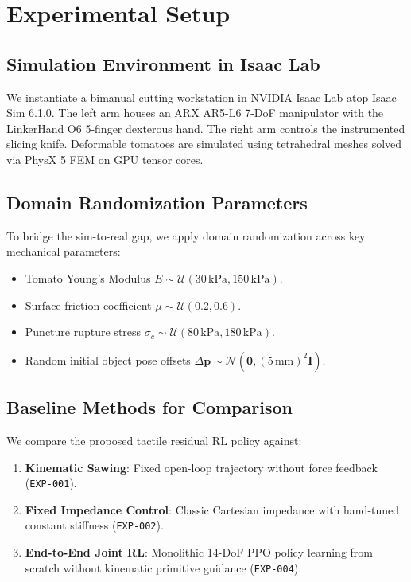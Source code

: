 \section{Experimental Setup}
\label{sec:experiments}

\subsection{Simulation Environment in Isaac Lab}
We instantiate a bimanual cutting workstation in NVIDIA Isaac Lab atop Isaac Sim 6.1.0. The left arm houses an ARX AR5-L6 7-DoF manipulator with the LinkerHand O6 5-finger dexterous hand. The right arm controls the instrumented slicing knife. Deformable tomatoes are simulated using tetrahedral meshes solved via PhysX 5 FEM on GPU tensor cores. 

\subsection{Domain Randomization Parameters}
To bridge the sim-to-real gap, we apply domain randomization across key mechanical parameters:
\begin{itemize}
    \item Tomato Young's Modulus $E \sim \mathcal{U}(30\,\text{kPa}, 150\,\text{kPa})$.
    \item Surface friction coefficient $\mu \sim \mathcal{U}(0.2, 0.6)$.
    \item Puncture rupture stress $\sigma_c \sim \mathcal{U}(80\,\text{kPa}, 180\,\text{kPa})$.
    \item Random initial object pose offsets $\Delta \mathbf{p} \sim \mathcal{N}(\mathbf{0}, (5\,\text{mm})^2 \mathbf{I})$.
\end{itemize}

\subsection{Baseline Methods for Comparison}
We compare the proposed tactile residual RL policy against:
\begin{enumerate}
    \item \textbf{Kinematic Sawing}: Fixed open-loop trajectory without force feedback (\texttt{EXP-001}).
    \item \textbf{Fixed Impedance Control}: Classic Cartesian impedance with hand-tuned constant stiffness (\texttt{EXP-002}).
    \item \textbf{End-to-End Joint RL}: Monolithic 14-DoF PPO policy learning from scratch without kinematic primitive guidance (\texttt{EXP-004}).
\end{enumerate}
